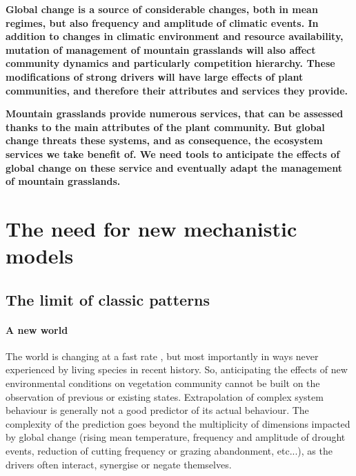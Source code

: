 \textbf{ Global change is a source of considerable changes, both in mean regimes, but also frequency and amplitude of climatic events. In addition to changes in climatic environment and resource availability, mutation of management of mountain grasslands will also affect community dynamics and particularly competition hierarchy. These modifications of strong drivers will have large effects of plant communities, and therefore their attributes and services they provide.}

\textbf{Mountain grasslands provide numerous services, that can be assessed thanks to the main attributes of the plant community. But global change threats these systems, and as consequence, the ecosystem services we take benefit of. We need tools to anticipate the effects of global change on these service and eventually adapt the management of mountain grasslands.}
%
%



 
%
\section{The need for new mechanistic models}


\subsection{The limit of classic patterns}
\paragraph{A new world}

The world is changing at a fast rate \parencite{butchart_global_2010, intergovernmental_panel_on_climate_change_climate_2014}, but most importantly in ways never experienced by living species in recent history. So, anticipating the effects of new environmental conditions on vegetation community cannot be built on the observation of previous or existing states. Extrapolation of complex system behaviour is generally not a good predictor of its actual behaviour. The complexity of the prediction goes beyond the multiplicity of dimensions impacted by global change (rising mean temperature, frequency and amplitude of drought events, reduction of cutting frequency or grazing abandonment, etc...), as the drivers often interact, synergise or negate themselves. 

